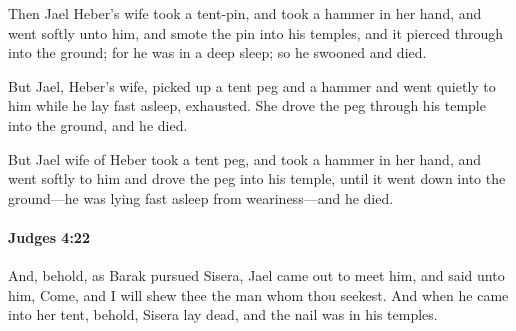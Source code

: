 			\begin{versebox}
					\item[BHS] 
					\item[ASV] Then Jael Heber's wife took a tent-pin, and took a hammer in her hand, and went softly unto him, and smote the pin into his temples, and it pierced through into the ground; for he was in a deep sleep; so he swooned and died.
					\item[NIV] But Jael, Heber’s wife, picked up a tent peg and a hammer and went quietly to him while he lay fast asleep, exhausted. She drove the peg through his temple into the ground, and he died.
					\item[NRSV] But Jael wife of Heber took a tent peg, and took a hammer in her hand, and went softly to him and drove the peg into his temple, until it went down into the ground—he was lying fast asleep from weariness—and he died.
			\end{versebox}

		\paragraph{Judges 4:22} %
			\label{JUDGES-4-22}

			And, behold, as Barak pursued Sisera, Jael came out to meet him, and said unto him, Come, and I will shew thee the man whom thou seekest. And when he came into her tent, behold, Sisera lay dead, and the nail was in his temples.

